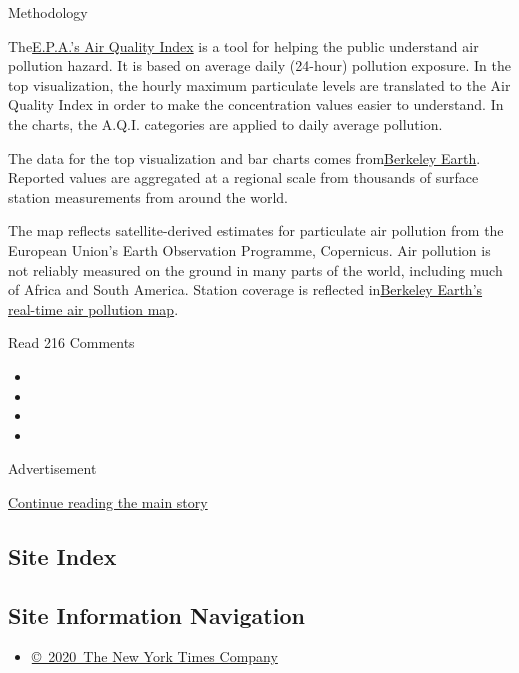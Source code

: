 Methodology

The\href{https://www.epa.gov/sites/production/files/2016-04/documents/2012_aqi_factsheet.pdf}{E.P.A.'s
Air Quality Index} is a tool for helping the public understand air
pollution hazard. It is based on average daily (24-hour) pollution
exposure. In the top visualization, the hourly maximum particulate
levels are translated to the Air Quality Index in order to make the
concentration values easier to understand. In the charts, the A.Q.I.
categories are applied to daily average pollution.

The data for the top visualization and bar charts comes
from\href{http://berkeleyearth.org/air-quality-real-time-map/}{}\href{http://berkeleyearth.org/air-quality-real-time-map/}{Berkeley
Earth}. Reported values are aggregated at a regional scale from
thousands of surface station measurements from around the world.

The map reflects satellite-derived estimates for particulate air
pollution from the European Union's Earth Observation Programme,
Copernicus. Air pollution is not reliably measured on the ground in many
parts of the world, including much of Africa and South America. Station
coverage is reflected
in\href{http://berkeleyearth.org/air-quality-real-time-map/}{}\href{http://berkeleyearth.org/air-quality-real-time-map/}{Berkeley
Earth's real-time air pollution map}.

Read 216 Comments

\begin{itemize}
\item
\item
\item
\item
\end{itemize}

Advertisement

\protect\hyperlink{after-bottom}{Continue reading the main story}

\hypertarget{site-index}{%
\subsection{Site Index}\label{site-index}}

\hypertarget{site-information-navigation}{%
\subsection{Site Information
Navigation}\label{site-information-navigation}}

\begin{itemize}
\tightlist
\item
  \href{https://help.nytimes3xbfgragh.onion/hc/en-us/articles/115014792127-Copyright-notice}{©~2020~The
  New York Times Company}
\end{itemize}

